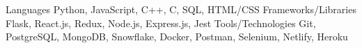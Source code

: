 
\begin{cvskills}
  \cvskill
    {Languages} %
    {Python, JavaScript, C++, C, SQL, HTML/CSS} %
  \cvskill
    {Frameworks/Libraries} %
    {Flask, React.js, Redux, Node.js, Express.js, Jest} %
  \cvskill
    {Tools/Technologies} %
    {Git, PostgreSQL, MongoDB, Snowflake, Docker, Postman, Selenium, Netlify, Heroku} %
\end{cvskills}

